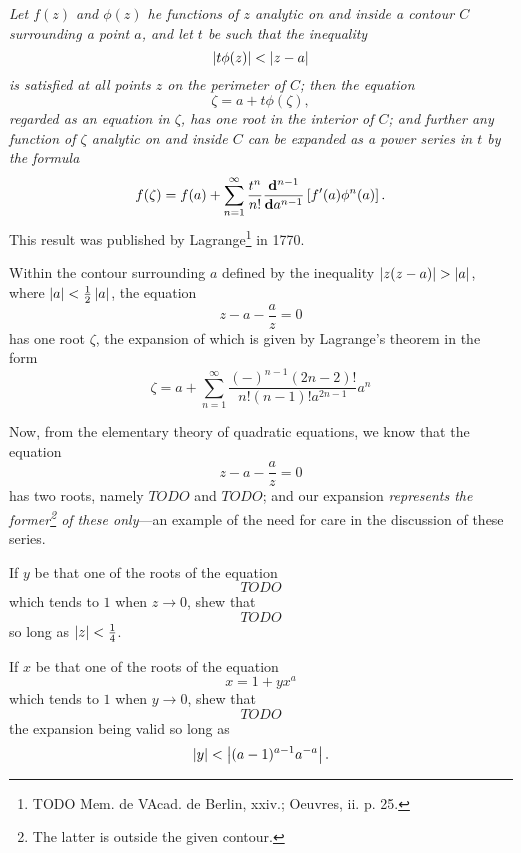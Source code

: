 \emph{Let $f(z)$ and $\phi(z)$ he functions of $z$ analytic on and inside a
contour $C$ surrounding a point $a$, and let $t$ be such that the inequality
$$
\left| t \phi(z)  \right| < \left| z - a \right|
$$
is satisfied at all points $z$ on the perimeter of $C$;
then the equation
$$
\zeta = a + t \phi(\zeta),
$$
regarded as an equation in $\zeta$, has one root in the interior
of $C$; and further any function of $\zeta$ analytic on and inside
$C$ can be expanded as a power series in $t$ by the formula
$$
f(\zeta)
=
f(a)
+
\sum_{n=1}^{\infty}
\frac{t^{n}}{n!}
\frac{\mathbf{d}^{n-1}}{\mathbf{d} a^{n-1}}
\left[ 
  f'(a) \phi^{n}(a)
 \right].
$$
}
This result was published by Lagrange\footnote{TODO Mem. de VAcad. de Berlin, xxiv.; Oeuvres, ii. p. 25.} in 1770.
\begin{wandwexample}
Within the contour surrounding $a$ defined by the inequality
$\left| z (z - a) \right| > \left| a \right|$, where
$\left| a \right| < \frac{1}{2} \left|  a  \right|$, %
the equation
$$
z - a - \frac{a}{z} = 0
$$
has one root $\zeta$, the expansion of which is given by Lagrange's theorem
in the form
$$
\zeta
=
a
+
\sum_{n=1}^{\infty}
\frac{(-)^{n-1} (2n-2)!}{n! (n-1)! a^{2n-1}} a^{n}
$$

Now, from the elementary theory of quadratic equations, we know that
the equation
$$
z - a - \frac{a}{z} = 0
$$
has two roots, namely $TODO$ and $TODO$; and our
expansion
\emph{represents the former\footnote{The latter is outside the given
    contour.} of these only}---an example of the need for
care in the discussion of these series.
\end{wandwexample}
\begin{wandwexample}
  If $y$ be that one of the roots of the equation
  $$
  TODO
  $$
  which tends to $1$ when $z \rightarrow 0$, shew that
  $$
  TODO
  $$
  so long as $\left| z \right| < \frac{1}{4}$.
\end{wandwexample}
\begin{wandwexample}
If $x$ be that one of the roots of the equation
$$
x = 1 + y x^{a}
$$
which tends to $1$ when $y \rightarrow 0$, shew that
$$
TODO
$$
the expansion being valid so long as
$$
\left| y \right|
<
\left| 
  (a-1)^{a-1} a^{-a}
 \right|.
$$
\end{wandwexample}

%
%


